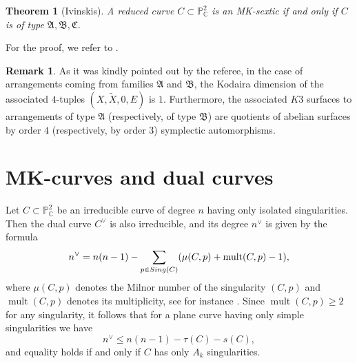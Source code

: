 \documentclass[11pt]{amsart}
\theoremstyle{plain}
\newtheorem{theorem}[thm]{Theorem}
\theoremstyle{definition}
\newtheorem{remark}[thm]{Remark}
\numberwithin{equation}{section}
\DeclareMathOperator{\mult}{mult}
\begin{document}
\begin{theorem}[Ivinskis]
\label{thmI}
A reduced curve $C \subset \mathbb{P}^{2}_{\mathbb{C}}$ is an MK-sextic if and only if $C$ is of type $\mathfrak{A}, \mathfrak{B}, \mathfrak{C}$.
\end{theorem}
For the proof, we refer to \cite[4.8.3 Theorem]{Ivinskis}.
\begin{remark}
As it was kindly pointed out by the referee, in the case of arrangements coming from families $\mathfrak{A}$ and $\mathfrak{B}$, the Kodaira dimension of the associated $4$-tuples $(X,\tilde{X},0,E)$ is $1$. Furthermore, the associated $K3$ surfaces to arrangements of type $\mathfrak{A}$ (respectively, of type $\mathfrak{B}$) are quotients of abelian surfaces by order $4$ (respectively, by order $3$) symplectic automorphisms.
\end{remark}


\section{MK-curves and dual curves}

Let $C \subset \mathbb{P}^{2}_{\mathbb{C}}$ be an irreducible curve of  degree $n$ having only isolated singularities. Then the dual curve 
$C^{\vee}$ is also irreducible, and its degree $n^{\vee}$ is given by the formula
\begin{equation}
\label{Eq1}
n^{\vee}=n(n-1)-\sum_{p \in {\rm Sing}(C)}(\mu(C,p)+\mult (C,p)-1),
\end{equation}
where $\mu(C,p)$ denotes the Milnor number of the singularity $(C,p)$ and $\mult (C,p)$ denotes its multiplicity, see for instance \cite[Formula (1.2.18)]{Dbook2}. Since $\mult (C,p)\geq 2$ for any singularity, it follows that for a plane curve having only simple singularities we have
\begin{equation}
\label{Eq2}
n^{\vee} \leq n(n-1)-\tau(C)-s(C),
\end{equation}
and equality holds if and only if  $C$ has only $A_k$ singularities.
\end{document}
